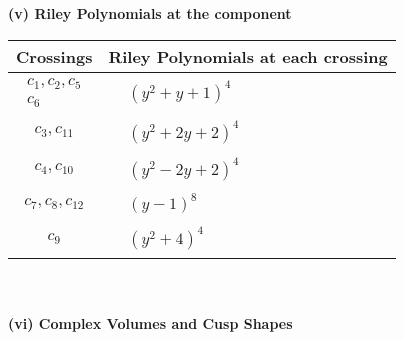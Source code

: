 \documentclass[1p]{elsarticle_modified}
\theoremstyle{definition}
\begin{document}
\newpage\renewcommand{\arraystretch}{1}
\flushleft \textbf{(v) Riley Polynomials at the component}\newline \\
\begin{tabular}{m{50pt}|m{274pt}}
Crossings & \hspace{64pt}Riley Polynomials at each crossing \\
\hline $$\begin{aligned}c_{1},c_{2},c_{5}\\c_{6}\end{aligned}$$&$\begin{aligned}
&(y^2+y+1)^4
\end{aligned}$\\
\hline $$\begin{aligned}c_{3},c_{11}\end{aligned}$$&$\begin{aligned}
&(y^2+2 y+2)^4
\end{aligned}$\\
\hline $$\begin{aligned}c_{4},c_{10}\end{aligned}$$&$\begin{aligned}
&(y^2-2 y+2)^4
\end{aligned}$\\
\hline $$\begin{aligned}c_{7},c_{8},c_{12}\end{aligned}$$&$\begin{aligned}
&(y-1)^8
\end{aligned}$\\
\hline $$\begin{aligned}c_{9}\end{aligned}$$&$\begin{aligned}
&(y^2+4)^4
\end{aligned}$\\
\hline
\end{tabular}\\~\\
\newpage\flushleft \textbf{(vi) Complex Volumes and Cusp Shapes}
\end{document}
